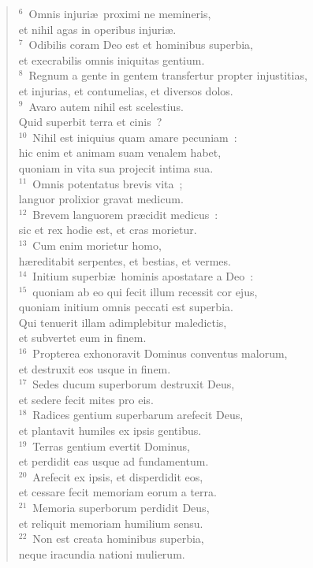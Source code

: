 \begin{verse}${}^{6}$~Omnis injuri\ae\ proximi ne memineris,\\ et nihil agas in operibus injuri\ae .\\
${}^{7}$~Odibilis coram Deo est et hominibus superbia,\\ et execrabilis omnis iniquitas gentium.\\
${}^{8}$~Regnum a gente in gentem transfertur propter injustitias,\\ et injurias, et contumelias, et diversos dolos.\\
${}^{9}$~Avaro autem nihil est scelestius.\\ Quid superbit terra et cinis~?\\
${}^{10}$~Nihil est iniquius quam amare pecuniam~:\\ hic enim et animam suam venalem habet,\\ quoniam in vita sua projecit intima sua.\\
${}^{11}$~Omnis potentatus brevis vita~;\\ languor prolixior gravat medicum.\\
${}^{12}$~Brevem languorem pr\ae cidit medicus~:\\ sic et rex hodie est, et cras morietur.\\
${}^{13}$~Cum enim morietur homo,\\ h\ae reditabit serpentes, et bestias, et vermes.\\
${}^{14}$~Initium superbi\ae\ hominis apostatare a Deo~:\\
${}^{15}$~quoniam ab eo qui fecit illum recessit cor ejus,\\ quoniam initium omnis peccati est superbia.\\ Qui tenuerit illam adimplebitur maledictis,\\ et subvertet eum in finem.\\
${}^{16}$~Propterea exhonoravit Dominus conventus malorum,\\ et destruxit eos usque in finem.\\
${}^{17}$~Sedes ducum superborum destruxit Deus,\\ et sedere fecit mites pro eis.\\
${}^{18}$~Radices gentium superbarum arefecit Deus,\\ et plantavit humiles ex ipsis gentibus.\\
${}^{19}$~Terras gentium evertit Dominus,\\ et perdidit eas usque ad fundamentum.\\
${}^{20}$~Arefecit ex ipsis, et disperdidit eos,\\ et cessare fecit memoriam eorum a terra.\\
${}^{21}$~Memoria superborum perdidit Deus,\\ et reliquit memoriam humilium sensu.\\
${}^{22}$~Non est creata hominibus superbia,\\ neque iracundia nationi mulierum.\end{verse}


